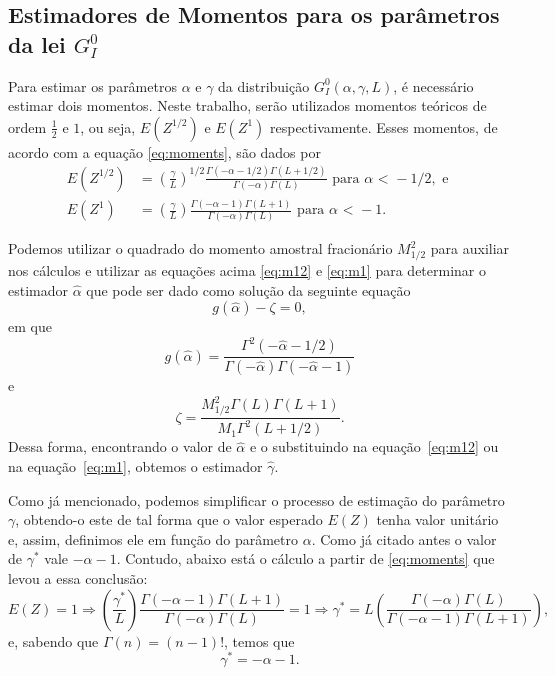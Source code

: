 \subsection{Estimadores de Momentos para os parâmetros da lei $G_I^0$}

Para estimar os parâmetros $\alpha$ e $\gamma$ da distribuição $G_I^0(\alpha, \gamma, L)$, é necessário estimar dois momentos. 
Neste trabalho, serão utilizados momentos teóricos de ordem $\frac{1}{2}$ e $1$, ou seja, $E(Z^{1/2})$ e $E(Z^{1})$ respectivamente. 
Esses momentos, de acordo com a equação \eqref{eq:moments}, são dados por
\begin{align}
    E(Z^{1/2}) &= \left ( \frac{\gamma}{L}\right )^{1/2} \frac{\Gamma(-\alpha-1/2)\Gamma(L+1/2)}{\Gamma(-\alpha)\Gamma(L)}  \text{ para } \alpha \text{ < } -1/2 \label{eq:m12}, \text{ e }\\
    E(Z^{1}) &= \left ( \frac{\gamma}{L}\right ) \frac{\Gamma(-\alpha-1)\Gamma(L+1)}{\Gamma(-\alpha)\Gamma(L)} \text{ para } \alpha \text{ < } -1. \label{eq:m1}
\end{align}

Podemos utilizar o quadrado do momento amostral fracionário $M_{1/2}^2$ para auxiliar nos cálculos e utilizar as equações acima \eqref{eq:m12} e \eqref{eq:m1} para determinar o estimador $\widehat{\alpha}$ que pode ser dado como solução da seguinte equação
\begin{equation}
    g(\widehat{\alpha}) - \zeta = 0,
\end{equation}
em que 
\begin{equation}
    g(\widehat{\alpha}) = \frac{\Gamma^2(-\widehat{\alpha} - 1/2)}{\Gamma(-\widehat{\alpha})\Gamma(-\widehat{\alpha} - 1)}
\end{equation}
e
\begin{equation}
    \zeta = \frac{M_{1/2}^2\Gamma(L)\Gamma(L+1)}{M_{1}\Gamma^2(L+1/2)}.
\end{equation}
Dessa forma, encontrando o valor de $\widehat{\alpha}$ e o substituindo na equação~\eqref{eq:m12} ou na equação~\eqref{eq:m1}, obtemos o estimador $\widehat{\gamma}$.

Como já mencionado, podemos simplificar o processo de estimação do parâmetro $\gamma$, obtendo-o este de tal forma que o valor esperado $E(Z)$ tenha valor unitário e, assim, definimos ele em função do parâmetro $\alpha$. Como já citado antes o valor de $\gamma^{*}$ vale $-\alpha - 1$. Contudo, abaixo está o cálculo a partir de \eqref{eq:moments} que levou a essa conclusão:
\begin{equation}
    E(Z) = 1 \Rightarrow \left (\frac{\gamma^{*}}{L}\right ) \frac{\Gamma(-\alpha-1)\Gamma(L+1)}{\Gamma(-\alpha)\Gamma(L)} = 1 \Rightarrow \gamma^{*} = L\left ( \frac{\Gamma(-\alpha)\Gamma(L)}{\Gamma(-\alpha-1)\Gamma(L+1)} \right ) ,
\end{equation}
e, sabendo que $\Gamma(n) = (n-1)!$, temos que
\begin{equation}
    \gamma^{*} = -\alpha - 1.
\end{equation}

